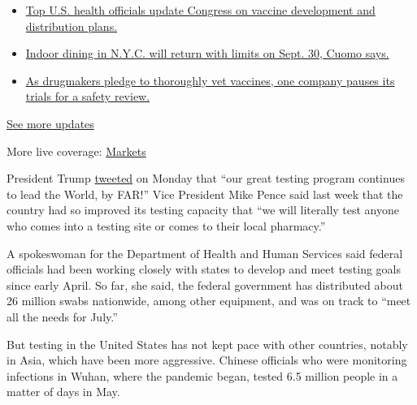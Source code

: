 \begin{itemize}
\tightlist
\item
  \href{https://www.nytimes3xbfgragh.onion/2020/09/09/world/covid-coronavirus.html?action=click\&pgtype=Article\&state=default\&region=MAIN_CONTENT_1\&context=storylines_live_updates\#link-279e24e2}{Top
  U.S. health officials update Congress on vaccine development and
  distribution plans.}
\item
  \href{https://www.nytimes3xbfgragh.onion/2020/09/09/world/covid-coronavirus.html?action=click\&pgtype=Article\&state=default\&region=MAIN_CONTENT_1\&context=storylines_live_updates\#link-792ae257}{Indoor
  dining in N.Y.C. will return with limits on Sept. 30, Cuomo says.}
\item
  \href{https://www.nytimes3xbfgragh.onion/2020/09/09/world/covid-coronavirus.html?action=click\&pgtype=Article\&state=default\&region=MAIN_CONTENT_1\&context=storylines_live_updates\#link-5b0bf0d1}{As
  drugmakers pledge to thoroughly vet vaccines, one company pauses its
  trials for a safety review.}
\end{itemize}

\href{https://www.nytimes3xbfgragh.onion/2020/09/09/world/covid-coronavirus.html?action=click\&pgtype=Article\&state=default\&region=MAIN_CONTENT_1\&context=storylines_live_updates}{See
more updates}

More live coverage:
\href{https://www.nytimes3xbfgragh.onion/live/2020/09/09/business/stock-market-today-coronavirus?action=click\&pgtype=Article\&state=default\&region=MAIN_CONTENT_1\&context=storylines_live_updates}{Markets}

President Trump
\href{https://twitter.com/realDonaldTrump/status/1280205902742781958?s=20}{tweeted}
on Monday that ``our great testing program continues to lead the World,
by FAR!'' Vice President Mike Pence said last week that the country had
so improved its testing capacity that ``we will literally test anyone
who comes into a testing site or comes to their local pharmacy.''

A spokeswoman for the Department of Health and Human Services said
federal officials had been working closely with states to develop and
meet testing goals since early April. So far, she said, the federal
government has distributed about 26 million swabs nationwide, among
other equipment, and was on track to ``meet all the needs for July.''

But testing in the United States has not kept pace with other countries,
notably in Asia, which have been more aggressive. Chinese officials who
were monitoring infections in Wuhan, where the pandemic began, tested
6.5 million people in a matter of days in May.

